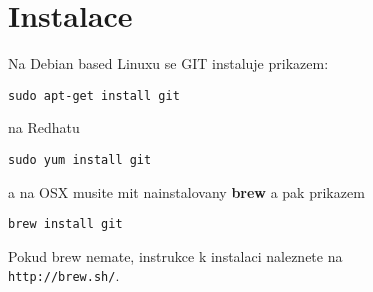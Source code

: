 \section{Instalace}

Na Debian based Linuxu se GIT instaluje prikazem:

\begin{lstlisting}
sudo apt-get install git
\end{lstlisting}

na Redhatu

\begin{lstlisting}
sudo yum install git
\end{lstlisting}

a na OSX musite mit nainstalovany {\bf brew} a pak prikazem

\begin{lstlisting}
brew install git
\end{lstlisting}

Pokud brew nemate, instrukce k instalaci naleznete na \\
\lstinline|http://brew.sh/|.

